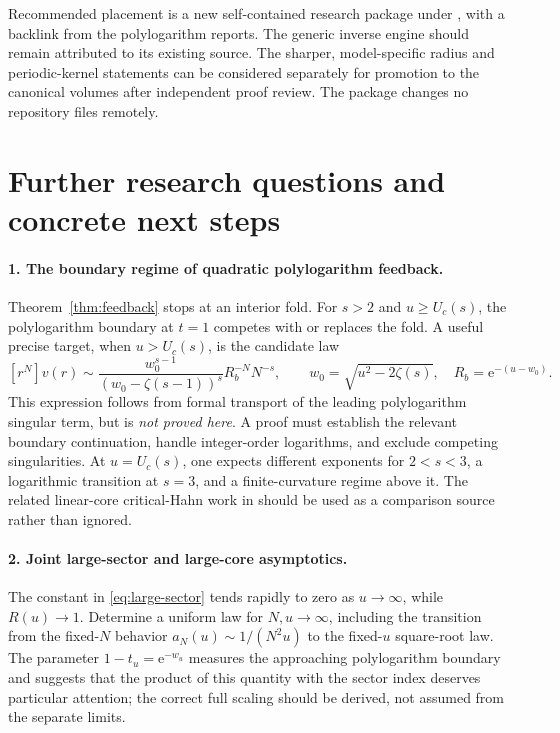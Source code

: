 \documentclass[11pt,a4paper]{article}
\theoremstyle{definition}\newtheorem{definition}[theorem]{Definition}
\theoremstyle{remark}\newtheorem{remark}[theorem]{Remark}
\newcommand{\ee}{\mathrm e}
\numberwithin{equation}{section}
\begin{document}
Recommended placement is a new self-contained research package under
, with a backlink
from the polylogarithm reports. The generic inverse engine should remain
attributed to its existing source. The sharper, model-specific radius and
periodic-kernel statements can be considered separately for promotion to
the canonical volumes after independent proof review. The package changes
no repository files remotely.

\section{Further research questions and concrete next steps}\label{sec:future}

\paragraph{1. The boundary regime of quadratic polylogarithm feedback.}
Theorem~\ref{thm:feedback} stops at an interior fold. For $s>2$ and
$u\ge U_c(s)$, the polylogarithm boundary at $t=1$ competes with or replaces
the fold. A useful precise target, when $u>U_c(s)$, is the candidate law
\[
 [r^N]v(r)\sim
 \frac{w_0^{s-1}}{(w_0-\zeta(s-1))^s}
       R_b^{-N}N^{-s},\qquad
 w_0=\sqrt{u^2-2\zeta(s)},\quad R_b=\ee^{-(u-w_0)}.
\]
This expression follows from formal transport of the leading
polylogarithm singular term, but is \emph{not proved here}. A proof must
establish the relevant boundary continuation, handle integer-order
logarithms, and exclude competing singularities. At $u=U_c(s)$, one expects
different exponents for $2<s<3$, a logarithmic transition at $s=3$, and a
finite-curvature regime above it. The related linear-core critical-Hahn
work in \cite{RepoCritical} should be used as a comparison source rather
than ignored.

\paragraph{2. Joint large-sector and large-core asymptotics.}
The constant in \eqref{eq:large-sector} tends rapidly to zero as
$u\to\infty$, while $R(u)\to1$. Determine a uniform law for $N,u\to\infty$,
including the transition from the fixed-$N$ behavior
$a_N(u)\sim1/(N^2u)$ to the fixed-$u$ square-root law. The parameter
$1-t_u=\ee^{-w_u}$ measures the approaching polylogarithm boundary and
suggests that the product of this quantity with the sector index deserves
particular attention; the correct full scaling should be derived, not
assumed from the separate limits.
\end{document}
